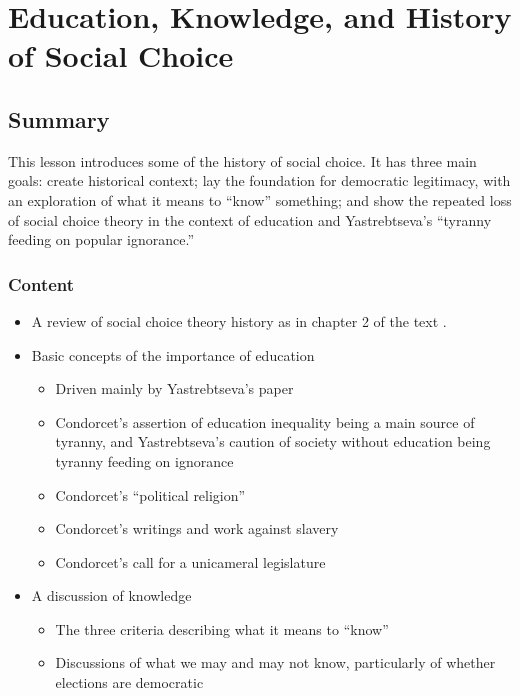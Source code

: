 \chapter{Education, Knowledge, and History of Social Choice}

\section{Summary}

This lesson introduces some of the history of social choice.  It has three main goals:  create historical context; lay the foundation for democratic legitimacy, with an exploration of what it means to ``know'' something; and show the repeated loss of social choice theory in the context of education and Yastrebtseva's ``tyranny feeding on popular ignorance.''

\subsection{Content}

\begin{itemize}
    \item A review of social choice theory history as in chapter 2 of the text \autocite{Heckelman2015}.
    \item Basic concepts of the importance of education
    \begin{itemize}
        \item Driven mainly by Yastrebtseva's paper

        \item Condorcet's assertion of education inequality being a main source of tyranny, and Yastrebtseva's caution of society without education being tyranny feeding on ignorance

        \item Condorcet's ``political religion''

        \item Condorcet's writings and work against slavery

        \item Condorcet's call for a unicameral legislature
    \end{itemize}

    \item A discussion of knowledge
    \begin{itemize}
        \item The three criteria describing what it means to ``know''

        \item Discussions of what we may and may not know, particularly of whether elections are democratic
    \end{itemize}
\end{itemize}

